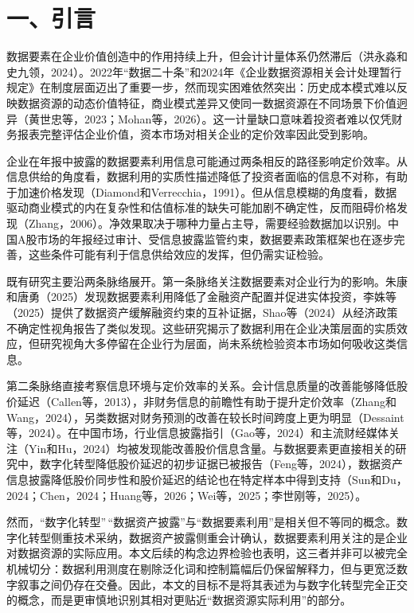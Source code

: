 \section{一、引言}\label{ux4e00ux5f15ux8a00}

数据要素在企业价值创造中的作用持续上升，但会计计量体系仍然滞后（洪永淼和史九领，2024）。2022年``数据二十条''和2024年《企业数据资源相关会计处理暂行规定》在制度层面迈出了重要一步，然而现实困难依然突出：历史成本模式难以反映数据资源的动态价值特征，商业模式差异又使同一数据资源在不同场景下价值迥异（黄世忠等，2023；Mohan等，2026）。这一计量缺口意味着投资者难以仅凭财务报表完整评估企业价值，资本市场对相关企业的定价效率因此受到影响。

企业在年报中披露的数据要素利用信息可能通过两条相反的路径影响定价效率。从信息供给的角度看，数据利用的实质性描述降低了投资者面临的信息不对称，有助于加速价格发现（Diamond和Verrecchia，1991）。但从信息模糊的角度看，数据驱动商业模式的内在复杂性和估值标准的缺失可能加剧不确定性，反而阻碍价格发现（Zhang，2006）。净效果取决于哪种力量占主导，需要经验数据加以识别。中国A股市场的年报经过审计、受信息披露监管约束，数据要素政策框架也在逐步完善，这些条件可能有利于信息供给效应的发挥，但仍需实证检验。

既有研究主要沿两条脉络展开。第一条脉络关注数据要素对企业行为的影响。朱康和唐勇（2025）发现数据要素利用降低了金融资产配置并促进实体投资，李姝等（2025）提供了数据资产缓解融资约束的互补证据，Shao等（2024）从经济政策不确定性视角报告了类似发现。这些研究揭示了数据利用在企业决策层面的实质效应，但研究视角大多停留在企业行为层面，尚未系统检验资本市场如何吸收这类信息。

第二条脉络直接考察信息环境与定价效率的关系。会计信息质量的改善能够降低股价延迟（Callen等，2013），非财务信息的前瞻性有助于提升定价效率（Zhang和Wang，2024），另类数据对财务预测的改善在较长时间跨度上更为明显（Dessaint等，2024）。在中国市场，行业信息披露指引（Gao等，2024）和主流财经媒体关注（Yin和Hu，2024）均被发现能改善股价信息含量。与数据要素更直接相关的研究中，数字化转型降低股价延迟的初步证据已被报告（Feng等，2024），数据资产信息披露降低股价同步性和股价延迟的结论也在特定样本中得到支持（Sun和Du，2024；Chen，2024；Huang等，2026；Wei等，2025；李世刚等，2025）。

然而，``数字化转型''\,``数据资产披露''与``数据要素利用''是相关但不等同的概念。数字化转型侧重技术采纳，数据资产披露侧重会计确认，数据要素利用关注的是企业对数据资源的实际应用。本文后续的构念边界检验也表明，这三者并非可以被完全机械切分：数据利用测度在剔除泛化词和控制篇幅后仍保留解释力，但与更宽泛数字叙事之间仍存在交叠。因此，本文的目标不是将其表述为与数字化转型完全正交的概念，而是更审慎地识别其相对更贴近``数据资源实际利用''的部分。

